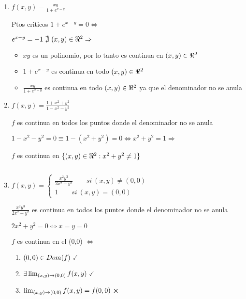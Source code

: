 \documentclass[../practica_03.tex]{subfiles}
\begin{document}
    \begin{enumerate}
        \item $f(x,y) = \frac{xy}{1+e^{x-y}}$

            Ptos criticos $ 1 + e^{x - y} = 0 \Leftrightarrow$

            $ e^{x - y} = -1\ \nexists\ (x,y) \in \real^2 \Rightarrow$

            \begin{itemize}
                \item $xy$ es un polinomio, por lo tanto es continua en $(x,y) \in \real^2$
                \item $1 + e^{x - y}$ es continua en todo $(x,y) \in \real^2$
                \item $\frac{xy}{1+e^{x-y}}$ es continua en todo $(x,y) \in \real^2$ ya que el denominador no se anula
            \end{itemize}

        \item $f(x,y) = \frac{1+x^2+y^2}{1-x^2-y^2}$

            $f$ es continua en todos los puntos donde el denominador no se anula

            $1-x^2-y^2 = 0 \equiv 1 - (x^2 + y^2) = 0 \Leftrightarrow x^2 + y^2 = 1 \Rightarrow$

            $f$ es continua en $\{(x,y) \in \real^2 : x^2+y^2 \neq 1 \}$

            $ $

        \item $f(x,y) = \left\{
            \begin{array}{ll}
                \frac{x^2y^3}{2x^2 +y^2} \qquad si\ (x,y)\neq(0,0)\\
                1 \qquad si\ (x,y) = (0,0)
            \end{array}
        \right.$

            $\frac{x^2y^3}{2x^2 +y^2}$ es continua en todos los puntos donde el denominador no se anula

            $ 2x^2 +y^2 = 0 \Leftrightarrow x = y = 0 $

            $f$ es continua en el (0,0) $\Leftrightarrow$

            \begin{enumerate}
                \item $(0,0) \in Dom(f)\ \checked$
                \item $\exists \lim_{(x,y)\to (0,0)} f(x,y)\ \checked$
                \item $\lim_{(x,y)\to (0,0)} f(x,y) = f(0,0)\ \crossproduct $
            \end{enumerate}


\end{enumerate}
\end{document}
